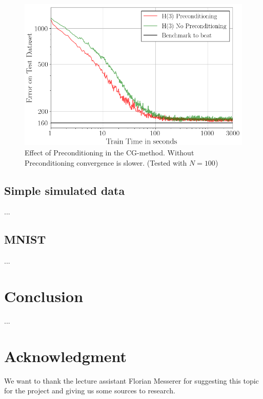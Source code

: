 \documentclass[conference]{IEEEtran}
\begin{document}
\begin{figure}[htbp]
	\centerline{\includegraphics[scale=0.53]{Precond.png}}
	\caption{Effect of Preconditioning in the CG-method. Without Preconditioning convergence is slower. (Tested with $N=100$)}
	\label{fig}
\end{figure}	


\subsection{Simple simulated data}
...

\subsection{MNIST}
...

\section{Conclusion}
...

\section*{Acknowledgment}
We want to thank the lecture assistant Florian Messerer for suggesting this topic for the project and giving us some sources to research. 
\end{document}
